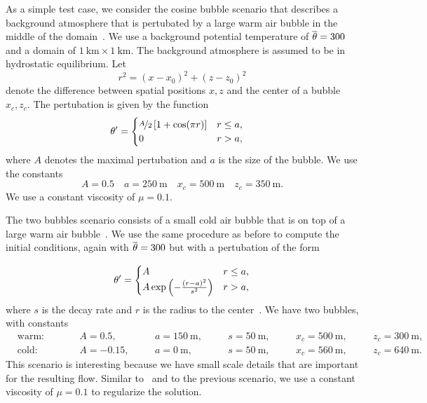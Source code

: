 As a simple test case, we consider the cosine bubble scenario that describes a background atmosphere that is pertubated by a large warm air bubble in the middle of the domain~\cite{giraldo2008study}.
We use a background potential temperature of $\overline{\theta} = 300$ and a domain of $\SI{1}{\km} \times \SI{1}{\km}$.
The background atmosphere is assumed to be in hydrostatic equilibrium.
Let
\begin{equation}
  \label{eq:radius}
  r^2 = (x - x_0)^2 + (z - z_0)^2
\end{equation}
denote the difference between spatial positions $x,z$ and the center of a bubble $x_c, z_c$.
The pertubation is given by the function
\begin{align}
  \label{eq:cos-pertubation}
  \theta' &= \begin{cases}
    \nicefrac{A}{2} \left[ 1 + \cos(\pi r) \right] & r \leq a, \\
    0 & r > a,
    \end{cases}
\end{align}
where $A$ denotes the maximal pertubation and $a$ is the size of the bubble.
We use the constants
\begin{equation}\label{eq:cosine-bubble}
  A = 0.5 \quad a = \SI{250}{\m} \quad x_c = \SI{500}{\m} \quad z_c = \SI{350}{\m}.
\end{equation}
We use a constant viscosity of $\mu = 0.1$.

The two bubbles scenario consists of a small cold air bubble that is on top of a large warm air bubble~\cite{robert1993bubble,muller2010adaptive}.
We use the same procedure as before to compute the initial conditions, again with $\overline{\theta} = 300$ but with a pertubation of the form

\begin{equation}
  \label{eq:bubbles-pertubation}
  \theta' =
  \begin{cases}
    A & r \leq a, \\
    A \exp \left( - \frac{(r-a)^2}{s^2} \right) & r > a,
    \end{cases}
\end{equation}
where $s$ is the decay rate and $r$  is the radius to the center~.
We have two bubbles, with constants
\begin{equation}
  \label{eq:bubbles-values}
\begin{alignedat}{6}
  & \text{warm:} \qquad && A = 0.5, \quad&& a = \SI{150}{\m}, \quad&& s = \SI{50}{\m}, \quad&& x_c = \SI{500}{\m,} \quad&& z_c = \SI{300}{\m},\\
  & \text{cold:} \qquad && A = -0.15, \quad&& a = \SI{0}{\m}, \quad&& s = \SI{50}{\m}, \quad&& x_c = \SI{560}{\m}, \quad&& z_c = \SI{640}{\m}.
  \end{alignedat}
\end{equation}
This scenario is interesting because we have small scale details that are important for the resulting flow.
Similar to~\cite{muller2010adaptive} and to the previous scenario, we use a constant viscosity of $\mu = 0.1$ to regularize the solution.

